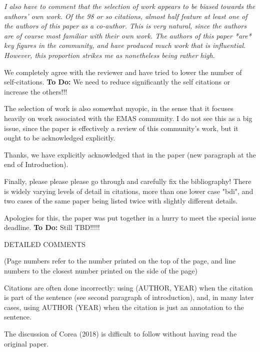 \documentclass[12pt]{article}
\newenvironment{reviews}{\bigskip\itshape}{\upshape\bigskip}
\newenvironment{response}{\bigskip\normalfont}{\bigskip}
\newcommand{\tbd}[1]{\textsf{\textbf{To Do:} #1}}
\begin{document}
\begin{reviews}
I also have to comment that the selection of work appears to be biased towards the authors' own work. Of the 98 or so citations, almost half feature at least one of the authors of this paper as a co-author. This is very natural, since the authors are of course most familiar with their own work. The authors of this paper *are* key figures in the community, and have produced much work that is influential. However, this proportion strikes me as nonetheless being rather high. 

\begin{response}
We completely agree with the reviewer and have tried to lower the number of self-citations. \tbd{We need to reduce significantly the self citations or increase the others!!!}
\end{response}

The selection of work is also somewhat myopic, in the sense that it focuses heavily on work associated with the EMAS community. I do not see this as a big issue, since the paper is effectively a review of this community's work, but it ought to be acknowledged explicitly.

\begin{response}
Thanks, we have explicitly acknowledged that in the paper (new paragraph at the end of Introduction).
\end{response}

Finally, please please please go through and carefully fix the bibliography! There is widely varying levels of detail in citations, more than one lower case "bdi", and two cases of the same paper being listed twice with slightly different details.  

\begin{response}
Apologies for this, the paper was put together in a hurry to meet the special issue deadline. \tbd{Still TBD!!!!!}
\end{response}

DETAILED COMMENTS

(Page numbers refer to the number printed on the top of the page, and line numbers to the closest number printed on the side of the page)

Citations are often done incorrectly: using (AUTHOR, YEAR) when the citation is part of the sentence (see second paragraph of introduction), and, in many later cases, using AUTHOR (YEAR) when the citation is just an annotation to the sentence. 

The discussion of Corea (2018) is difficult to follow without having read the original paper. 


\end{reviews}
\end{document}
